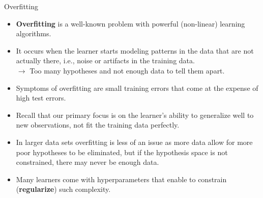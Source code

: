 \begin{vbframe}{Overfitting}
\framebreak

\begin{itemize}
  \item \textbf{Overfitting} is a well-known problem with powerful 
  (non-linear) learning algorithms.
  \item It occurs when the learner starts modeling patterns in the data 
  that are not actually there, i.e., noise or artifacts in the training data. \\
  $\rightarrow$ Too many hypotheses and not enough data to tell them apart.
  \item Symptoms of overfitting are small training errors that come at the 
  expense of high test errors.
  \item Recall that our primary focus is on the learner's ability to generalize 
  well to new observations, not fit the training data perfectly.
  \item In larger data sets overfitting is less of an issue as more data allow 
  for more poor hypotheses to be eliminated, but if the hypothesis space is not 
  constrained, there may never be enough data.
  \item Many learners come with hyperparameters that enable to constrain 
  (\textbf{regularize}) such complexity.
\end{itemize}

\end{vbframe}


% 
% 


